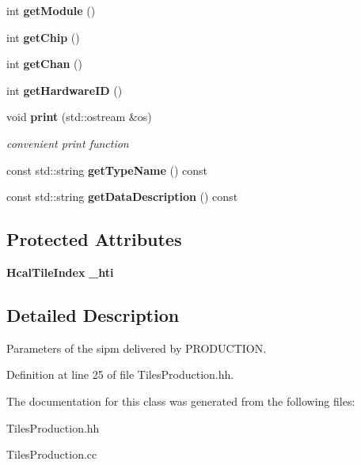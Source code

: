 \begin{DoxyCompactItemize}
\item 
int {\bfseries getModule} ()\label{classCALICE_1_1TilesProduction_a3dabeea49b7615deb2664aae17842d13}

\item 
int {\bfseries getChip} ()\label{classCALICE_1_1TilesProduction_a37933d4fc27281b950049577a0f387ab}

\item 
int {\bfseries getChan} ()\label{classCALICE_1_1TilesProduction_a5f3437ca70d5d1e2641cb750e3ece6a6}

\item 
int {\bfseries getHardwareID} ()\label{classCALICE_1_1TilesProduction_a0e231fffa77a4871cf14b6abbb654c62}

\item 
void {\bf print} (std::ostream \&os)\label{classCALICE_1_1TilesProduction_a87511cf3aa3319007a2909baed09ea8e}

\begin{DoxyCompactList}\small\item\em convenient print function \item\end{DoxyCompactList}\item 
const std::string {\bfseries getTypeName} () const \label{classCALICE_1_1TilesProduction_abe1b268a8c5ec422c44be2ac431f2546}

\item 
const std::string {\bfseries getDataDescription} () const \label{classCALICE_1_1TilesProduction_a7a6f5cf764abcee38722460321c9d8e9}

\end{DoxyCompactItemize}
\subsection*{Protected Attributes}
\begin{DoxyCompactItemize}
\item 
{\bf HcalTileIndex} {\bfseries \_\-hti}\label{classCALICE_1_1TilesProduction_a7292957b19e4f50605378a3a51545973}

\end{DoxyCompactItemize}


\subsection{Detailed Description}
Parameters of the sipm delivered by PRODUCTION. 

Definition at line 25 of file TilesProduction.hh.

The documentation for this class was generated from the following files:\begin{DoxyCompactItemize}
\item 
TilesProduction.hh\item 
TilesProduction.cc\end{DoxyCompactItemize}
